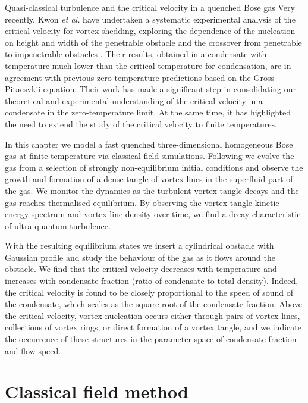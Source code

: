 \begin{chapter}{\label{cha:nonequib}Quasi-classical turbulence and the critical velocity in a quenched Bose gas}
Very recently, Kwon {\it et al.} have undertaken a systematic experimental analysis of the critical velocity for vortex
shedding, exploring the dependence of the nucleation on height and width of the penetrable obstacle and the crossover
from penetrable to impenetrable obstacles \cite{kwon_2015a}. Their results, obtained in a condensate with temperature much lower than
the critical temperature for condensation, are in agreement with previous zero-temperature predictions based on the
Gross-Pitaesvkii equation. Their work has made a significant step in consolidating our theoretical and experimental understanding of the critical velocity in a condensate in the zero-temperature limit.  At the same time, it has highlighted the need to extend the study
of the critical velocity to finite temperatures.

In this chapter we model a fast quenched three-dimensional homogeneous Bose gas at finite
temperature via classical field simulations. Following \cite{PhysRevA.66.013603} we evolve the gas from a selection of strongly non-equilibrium initial conditions and observe the growth and formation of a dense tangle of vortex lines in the superfluid part of the gas. We monitor the dynamics as the turbulent vortex tangle decays and the gas reaches thermalised equilibrium. By observing the vortex tangle kinetic energy spectrum and vortex line-density over time, we find a decay characteristic of ultra-quantum turbulence.

With the resulting equilibrium states we insert a cylindrical obstacle with Gaussian profile and study the behaviour of the gas as it flows around the obstacle. We find that the critical velocity decreases with temperature and
increases with condensate fraction (ratio of condensate to total density).
Indeed, the critical velocity is found to be closely proportional
to the speed of sound of the condensate, which scales as the square
root of the condensate fraction. Above
the critical velocity, vortex nucleation occurs either through
pairs of vortex lines, collections of vortex rings, or direct formation of a vortex tangle, and we indicate the occurrence of these structures in the parameter space of condensate fraction and flow speed.

\section{Classical field method}
\label{sec:theory}


\end{chapter}
